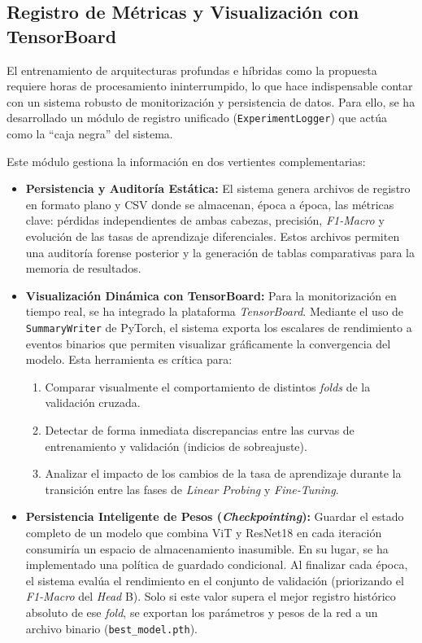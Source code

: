 \subsection{Registro de Métricas y Visualización con TensorBoard}

El entrenamiento de arquitecturas profundas e híbridas como la propuesta requiere horas de procesamiento ininterrumpido, lo que hace indispensable contar con un sistema robusto de monitorización y persistencia de datos. Para ello, se ha desarrollado un módulo de registro unificado (\texttt{ExperimentLogger}) que actúa como la ``caja negra'' del sistema.

Este módulo gestiona la información en dos vertientes complementarias:

\begin{itemize}
	\item \textbf{Persistencia y Auditoría Estática:} El sistema genera archivos de registro en formato plano y CSV donde se almacenan, época a época, las métricas clave: pérdidas independientes de ambas cabezas, precisión, \textit{F1-Macro} y evolución de las tasas de aprendizaje diferenciales. Estos archivos permiten una auditoría forense posterior y la generación de tablas comparativas para la memoria de resultados.
	
	\item \textbf{Visualización Dinámica con TensorBoard:} Para la monitorización en tiempo real, se ha integrado la plataforma \textit{TensorBoard}. Mediante el uso de \texttt{SummaryWriter} de PyTorch, el sistema exporta los escalares de rendimiento a eventos binarios que permiten visualizar gráficamente la convergencia del modelo. Esta herramienta es crítica para:
	\begin{enumerate}
		\item Comparar visualmente el comportamiento de distintos \textit{folds} de la validación cruzada.
		\item Detectar de forma inmediata discrepancias entre las curvas de entrenamiento y validación (indicios de sobreajuste).
		\item Analizar el impacto de los cambios de la tasa de aprendizaje durante la transición entre las fases de \textit{Linear Probing} y \textit{Fine-Tuning}.
	\end{enumerate}
		
	\item \textbf{Persistencia Inteligente de Pesos (\textit{Checkpointing}):} Guardar el estado completo de un modelo que combina ViT y ResNet18 en cada iteración consumiría un espacio de almacenamiento inasumible. En su lugar, se ha implementado una política de guardado condicional. Al finalizar cada época, el sistema evalúa el rendimiento en el conjunto de validación (priorizando el \textit{F1-Macro} del \textit{Head} B). Solo si este valor supera el mejor registro histórico absoluto de ese \textit{fold}, se exportan los parámetros y pesos de la red a un archivo binario (\texttt{best\_model.pth}). 
\end{itemize}

